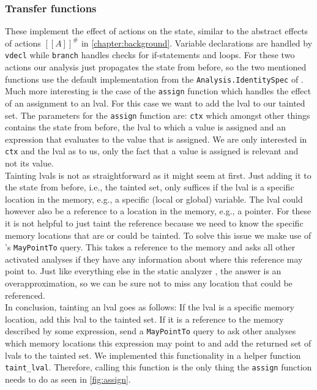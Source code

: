    \subsubsection{Transfer functions}
      These implement the effect of actions on the state, similar to the abstract effects of actions $[\![A]\!]^{\#}$ in \autoref{chapter:background}. Variable declarations are handled by \texttt{vdecl} while \texttt{branch} handles checks for if-statements and loops. For these two actions our analysis just propagates the state from before, so the two mentioned functions use the default implementation from the \texttt{Analysis.IdentitySpec} of \gob.\\
      Much more interesting is the case of the \texttt{assign} function which handles the effect of an assignment to an \ac{lval}. For this case we want to add the \ac{lval} to our tainted set. The parameters for the \texttt{assign} function are: \texttt{ctx} which amongst other things contains the state from before, the \ac{lval} to which a value is assigned and an expression that evaluates to the value that is assigned. We are only interested in \texttt{ctx} and the \ac{lval} as to us, only the fact that a value is assigned is relevant and not its value.\\
      Tainting \ac{lval}s is not as straightforward as it might seem at first. Just adding it to the state from before, i.e., the tainted set, only suffices if the \ac{lval} is a specific location in the memory, e.g., a specific (local or global) variable. The \ac{lval} could however also be a reference to a location in the memory, e.g., a pointer. For these it is not helpful to just taint the reference because we need to know the specific memory locations that are or could be tainted. To solve this issue we make use of \gob's \texttt{MayPointTo} query. This takes a reference to the memory and asks all other activated analyses if they have any information about where this reference may point to. Just like everything else in the static analyzer \gob, the answer is an overapproximation, so we can be sure not to miss any location that could be referenced.\\
      In conclusion, tainting an \ac{lval} goes as follows: If the \ac{lval} is a specific memory location, add this \ac{lval} to the tainted set. If it is a reference to the memory described by some expression, send a \texttt{MayPointTo} query to ask other analyses which memory locations this expression may point to and add the returned set of \ac{lval}s to the tainted set. We implemented this functionality in a helper function \texttt{taint\_lval}. Therefore, calling this function is the only thing the \texttt{assign} function needs to do as seen in \autoref{fig:assign}.


